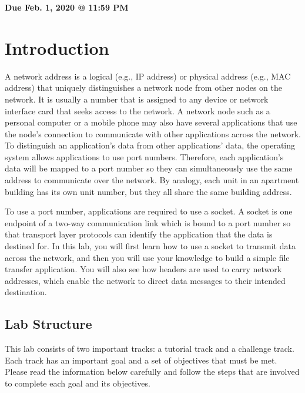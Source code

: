 \documentclass[11pt]{article}
\makeatletter
\def\datedue{Feb. 1, 2020 @ 11:59 PM}
\makeatother
\begin{document}
\maketitle \thispagestyle{fancy}

\hfill {\large \textbf{Due \datedue}}


\section{Introduction}
\label{sec:introduction}
A network address is a logical (e.g., IP address) or physical address (e.g., MAC address) that uniquely distinguishes a network node from other nodes on the network.
It is usually a number that is assigned to any device or network interface card that seeks access to the network.
A network node such as a personal computer or a mobile phone may also have several applications that use the node's connection to communicate with other applications across the network.
To distinguish an application's data from other applications' data, the operating system allows applications to use port numbers.
Therefore, each application's data will be mapped to a port number so they can simultaneously use the same address to communicate over the network.
By analogy, each unit in an apartment building has its own unit number, but they all share the same building address.

To use a port number, applications are required to use a socket. A socket is one endpoint of a two-way communication link which is bound to a port number so that transport layer protocols can identify the application that the data is destined for.
In this lab, you will first learn how to use a socket to transmit data across the network, and then you will use your knowledge to build a simple file transfer application.
You will also see how headers are used to carry network addresses, which enable the network to direct data messages to their intended destination.

\subsection{Lab Structure}
\label{subsec:lab-structure}
This lab consists of two important tracks: a tutorial track and a challenge track. Each track has an important goal and a set of objectives that must be met.
Please read the information below carefully and follow the steps that are involved to complete each goal and its objectives.
\end{document}
